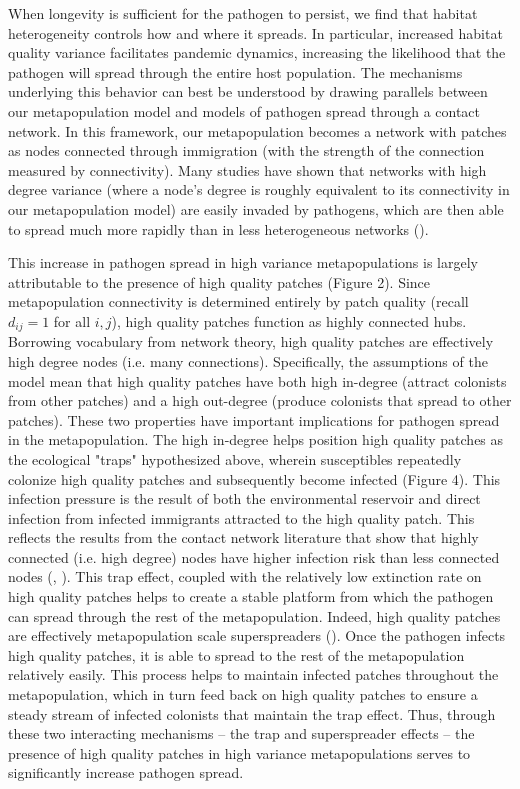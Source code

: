 \documentclass{svjour3}
\begin{document}
When longevity is sufficient for the pathogen to persist, we find that habitat heterogeneity controls how and where it spreads.  In particular, increased habitat quality variance facilitates pandemic dynamics, increasing the likelihood that the pathogen will spread through the entire host population.  The mechanisms underlying this behavior can best be understood by drawing parallels between our metapopulation model and models of pathogen spread through a contact network.  In this framework, our metapopulation becomes a network with patches as nodes connected through immigration (with the strength of the connection measured by connectivity).  Many studies have shown that networks with high degree variance (where a node's degree is roughly equivalent to its connectivity in our metapopulation model) are easily invaded by pathogens, which are then able to spread much more rapidly than in less heterogeneous networks (\cite{Pastor-Satorras2001}).

This increase in pathogen spread in high variance metapopulations is largely attributable to the presence of high quality patches (Figure 2).  Since metapopulation connectivity is determined entirely by patch quality (recall $d_{ij}=1$ for all $i, j$), high quality patches function as highly connected hubs.  Borrowing vocabulary from network theory, high quality patches are effectively high degree nodes (i.e. many connections).  Specifically, the assumptions of the model mean that high quality patches have both high in-degree (attract colonists from other patches) and a high out-degree (produce colonists that spread to other patches).  These two properties have important implications for pathogen spread in the metapopulation. The high in-degree helps position high quality patches as the ecological "traps" hypothesized above, wherein susceptibles repeatedly colonize high quality patches and subsequently become infected (Figure 4).  This infection pressure is the result of both the environmental reservoir and direct infection from infected immigrants attracted to the high quality patch.  This reflects the results from the contact network literature that show that highly connected (i.e. high degree) nodes have higher infection risk than less connected nodes (\cite{Christley2005}, \cite{Keeling2005}).  This trap effect, coupled with the relatively low extinction rate on high quality patches helps to create a stable platform from which the pathogen can spread through the rest of the metapopulation.  Indeed, high quality patches are effectively metapopulation scale superspreaders (\cite{Lloyd-Smith2005}).  Once the pathogen infects high quality patches, it is able to spread to the rest of the metapopulation relatively easily.  This process helps to maintain infected patches throughout the metapopulation, which in turn feed back on high quality patches to ensure a steady stream of infected colonists that maintain the trap effect.  Thus, through these two interacting mechanisms -- the trap and superspreader effects -- the presence of high quality patches in high variance metapopulations serves to significantly increase pathogen spread.  
\end{document}
